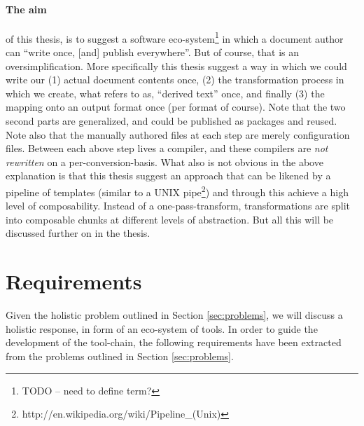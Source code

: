 \documentclass{scrreprt}
\begin{document}
\paragraph{The aim} of this thesis, is to suggest a software eco-system\footnote{TODO -- need to define term?} in which a document author can ``write once, [and] publish everywhere''. But of course, that is an oversimplification. More specifically this thesis suggest a way in which we could write our (1) actual document contents once, (2) the transformation process in which we create, what \citet{reid} refers to as, ``derived text'' once, and finally (3) the mapping onto an output format once (per format of course). Note that the two second parts are generalized, and could be published as packages and reused. Note also that the manually authored files at each step are merely configuration files. Between each above step lives a compiler, and these compilers are \emph{not rewritten} on a per-conversion-basis. What also is not obvious in the above explanation is that this thesis suggest an approach that can be likened by a pipeline of templates (similar to a UNIX pipe\footnote{http://en.wikipedia.org/wiki/Pipeline\_(Unix)}) and through this achieve a high level of composability. Instead of a one-pass-transform, transformations are split into composable chunks at different levels of abstraction. But all this will be discussed further on in the thesis.









\section{Requirements}
\label{sec:requirements-initial}
Given the holistic problem outlined in Section \ref{sec:problems}, we will discuss a holistic response, in form of an eco-system of tools. In order to guide the development of the tool-chain, the following requirements have been extracted from the problems outlined in Section \ref{sec:problems}.
\end{document}
